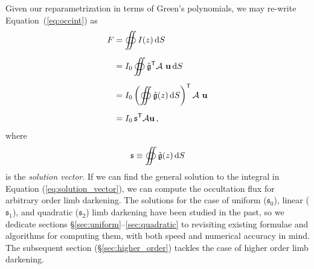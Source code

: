 \documentclass[modern,trackchanges]{aastex63}
\begin{document}
Given our reparametrization in terms of Green's polynomials, we may
re-write Equation~(\ref{eq:occint}) as
%
\begin{align}
    \label{eq:occint_greens}
    F &= \oiint I(z) \, \dd S \nonumber \\[0.5em]
      &= I_0 \oiint \gbasis^\mathsf{T} \mathcal{A} \ \bvec{u} \, \dd S \,  \nonumber \\[0.5em]
      &= I_0 \left( \oiint \gbasis (z) \, \dd S \right)^\mathsf{T} \mathcal{A} \ \bvec{u} \nonumber \\[0.5em]
      &= I_0 \, \mathfrak{s}^\mathsf{T} \mathcal{A} \bvec{u} \quad ,
\end{align}
%
where
%
\begin{align}
    \label{eq:solution_vector}
    \mathfrak{s} \equiv \oiint \tilde{\mathfrak{g}} (z) \,  \mathrm{d} S
\end{align}
%
is the \emph{solution vector}.
If we can find the general solution to the integral in Equation (\ref{eq:solution_vector}),
we can compute the occultation flux for arbitrary order limb darkening.
The solutions for the case of uniform ($\mathfrak{s}_0$), linear ($\mathfrak{s}_1$),
and quadratic ($\mathfrak{s}_2$) limb darkening have been studied in
the past, so we dedicate sections \S\ref{sec:uniform}--\ref{sec:quadratic}
to revisiting existing formulae and algorithms for computing them, with both speed and numerical accuracy
in mind. The subsequent section (\S\ref{sec:higher_order}) tackles the case of higher order
limb darkening.
\end{document}
